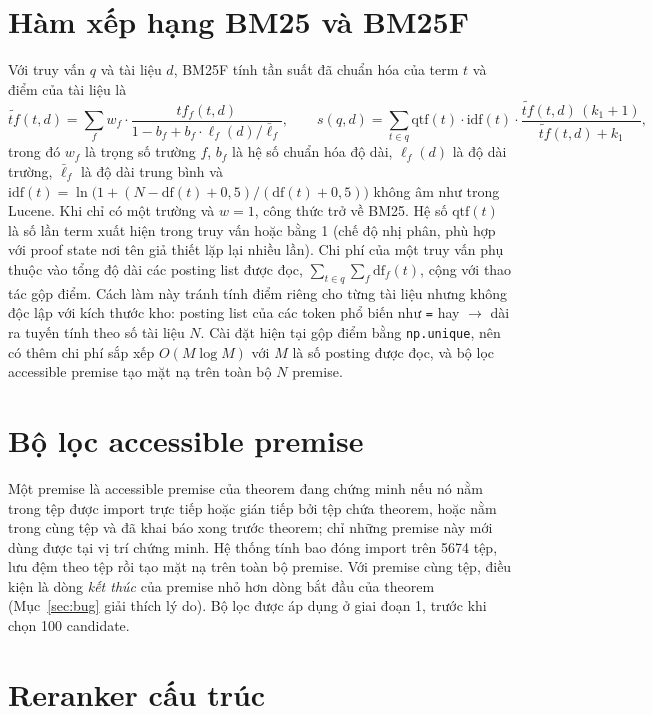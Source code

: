 \documentclass[11pt,a4paper,oneside]{report}
\newcommand{\code}[1]{\texttt{#1}}
\begin{document}
\section{Hàm xếp hạng BM25 và BM25F}

Với truy vấn $q$ và tài liệu $d$, BM25F tính tần suất đã chuẩn hóa của term $t$ và điểm của tài liệu là
\begin{equation}
\tilde{tf}(t,d) = \sum_{f} w_f \cdot \frac{tf_f(t,d)}{1 - b_f + b_f \cdot \ell_f(d)/\bar{\ell}_f},
\qquad
s(q,d) = \sum_{t \in q} \mathrm{qtf}(t) \cdot \mathrm{idf}(t) \cdot \frac{\tilde{tf}(t,d)\,(k_1 + 1)}{\tilde{tf}(t,d) + k_1},
\end{equation}
trong đó $w_f$ là trọng số trường $f$, $b_f$ là hệ số chuẩn hóa độ dài, $\ell_f(d)$ là độ dài trường, $\bar{\ell}_f$ là độ
dài trung bình và $\mathrm{idf}(t) = \ln\big(1 + (N - \mathrm{df}(t) + 0{,}5)/(\mathrm{df}(t) + 0{,}5)\big)$ không âm như
trong Lucene. Khi chỉ có một trường và $w = 1$, công thức trở về BM25. Hệ số $\mathrm{qtf}(t)$ là số lần term xuất hiện
trong truy vấn hoặc bằng 1 (chế độ nhị phân, phù hợp với proof state nơi tên giả thiết lặp lại nhiều lần). Chi phí của một
truy vấn phụ thuộc vào tổng độ dài các posting list được đọc, $\sum_{t \in q}\sum_f \mathrm{df}_f(t)$, cộng với thao tác gộp
điểm. Cách làm này tránh tính điểm riêng cho từng tài liệu nhưng không độc lập với kích thước kho: posting list của các token phổ
biến như \code{=} hay $\to$ dài ra tuyến tính theo số tài liệu $N$. Cài đặt hiện tại gộp điểm bằng \code{np.unique}, nên có
thêm chi phí sắp xếp $O(M \log M)$ với $M$ là số posting được đọc, và bộ lọc accessible premise tạo mặt nạ trên toàn bộ $N$
premise.

\section{Bộ lọc accessible premise}

Một premise là accessible premise của theorem đang chứng minh nếu nó nằm trong tệp được import trực tiếp hoặc gián tiếp
bởi tệp chứa theorem, hoặc nằm trong cùng tệp và đã khai báo xong trước theorem; chỉ những premise này mới dùng được tại
vị trí chứng minh. Hệ thống tính bao đóng import trên \num{5674} tệp, lưu đệm theo tệp
rồi tạo mặt nạ trên toàn bộ premise. Với premise cùng tệp, điều kiện là dòng \emph{kết thúc} của premise nhỏ hơn dòng bắt
đầu của theorem (Mục~\ref{sec:bug} giải thích lý do). Bộ lọc được áp dụng ở giai đoạn 1, trước khi chọn 100 candidate.

\section{Reranker cấu trúc}
\end{document}
